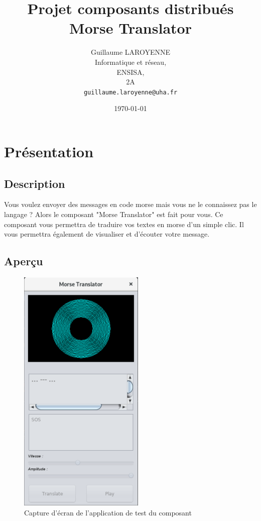 \documentclass[a4paper,11pt]{article}
\title{Projet composants distribués\\\bigskip \textbf{Morse Translator}}
\author{Guillaume LAROYENNE\\
   Informatique et réseau,\\
   ENSISA,\\
   2A\\
   \bigskip
   \texttt{guillaume.laroyenne@uha.fr}
   }
\date{\today}
\begin{document}
  \maketitle
      
  \newpage

	\section{Présentation}
	\subsection{Description}
	Vous voulez envoyer des messages en code morse mais vous ne le connaissez pas le langage ? Alors le composant "Morse Translator" est fait pour vous. Ce composant vous permettra de traduire vos textes en morse d'un simple clic. Il vous permettra également de visualiser et d'écouter votre message.
	
    \subsection{Aperçu}
    \begin{figure}[H]
    	\begin{center}
    		\includegraphics[scale=0.8]{descpicture.png}
    		\caption{Capture d'écran de l'application de test du composant}
    		\label{Capture d'écran de l'application de test du composant}
    	\end{center}
    \end{figure}
    
\end{document}
